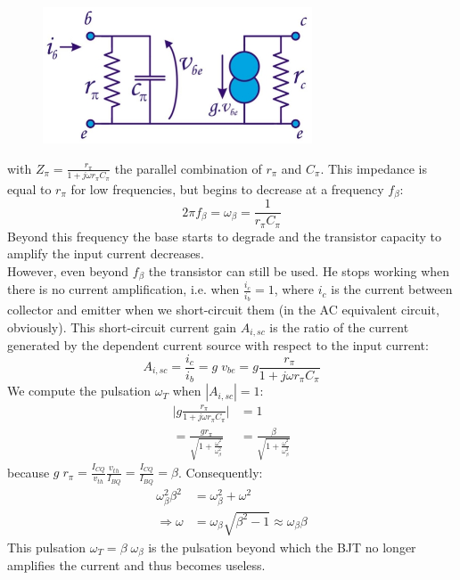 \begin{figure}[h!]
	\centering
	\includegraphics[width=8cm]{figures/ch03/hf_model1.jpg}
	\caption{}
	\label{fig:hf_model1}
\end{figure}
with $Z_{\pi} = \frac{r_{\pi}}{1 + j \omega r_{\pi}C_{\pi}}$ the parallel combination of $r_{\pi}$ and $C_{\pi}$. This impedance is equal to $r_{\pi}$ for low frequencies, but begins to decrease at a frequency $f_{\beta}$:
$$ 2 \pi f_{\beta} = \omega_{\beta} = \frac{1}{r_{\pi} C_{\pi}}$$
Beyond this frequency the base starts to degrade and the transistor capacity to amplify the input current decreases.\\
However, even beyond $f_{\beta}$ the transistor can still be used. He stops working when there is no current amplification, i.e. when $\frac{i_c}{i_b} = 1$, where $i_c$ is the current between collector and emitter when we short-circuit them (in the AC equivalent circuit, obviously). This short-circuit current gain $A_{i, sc}$ is the ratio of the current generated by the dependent current source with respect to the input current:
$$
A_{i, sc} = \frac{i_c}{i_b} = g \; v_{be} = g  \frac{r_{\pi}}{1 + j \omega r_{\pi}C_{\pi}}
$$
We compute the pulsation $\omega_T$ when $| A_{i, sc} | = 1$:
\begin{align*}
	\Bigg| g  \frac{r_{\pi}}{1 + j \omega r_{\pi}C_{\pi}} \Bigg| &= 1 \\
		= \frac{g r_{\pi}}{\sqrt{1 + \frac{\omega^2}{\omega_{\beta}^2}}} 
		&= \frac{\beta}{\sqrt{1 + \frac{\omega^2}{\omega_{\beta}^2}}}
\end{align*}
because $g \; r_{\pi} = \frac{I_{CQ}}{v_{th}} \frac{v_{th}}{I_{BQ}} = \frac{I_{CQ}}{I_{BQ}} = \beta$. Consequently:
\begin{align*}
	\omega_{\beta}^2 \beta^2 &= \omega_{\beta}^2 + \omega^2 \\
	\Rightarrow \omega &= \omega_{\beta} \sqrt{\beta^2 - 1} \approx  \omega_{\beta} \beta
\end{align*}
This pulsation $\omega_T = \beta \; \omega_{\beta}$ is the pulsation beyond which the BJT no longer amplifies the current and thus becomes useless.

